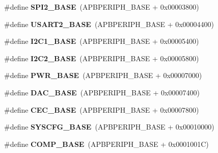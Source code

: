 \begin{DoxyCompactItemize}
\#define {\bfseries S\+P\+I2\+\_\+\+B\+A\+SE}~(A\+P\+B\+P\+E\+R\+I\+P\+H\+\_\+\+B\+A\+SE + 0x00003800)
\item 
\mbox{\label{group___peripheral__memory__map_gade83162a04bca0b15b39018a8e8ec090}} 
\#define {\bfseries U\+S\+A\+R\+T2\+\_\+\+B\+A\+SE}~(A\+P\+B\+P\+E\+R\+I\+P\+H\+\_\+\+B\+A\+SE + 0x00004400)
\item 
\mbox{\label{group___peripheral__memory__map_gacd72dbffb1738ca87c838545c4eb85a3}} 
\#define {\bfseries I2\+C1\+\_\+\+B\+A\+SE}~(A\+P\+B\+P\+E\+R\+I\+P\+H\+\_\+\+B\+A\+SE + 0x00005400)
\item 
\mbox{\label{group___peripheral__memory__map_ga04bda70f25c795fb79f163b633ad4a5d}} 
\#define {\bfseries I2\+C2\+\_\+\+B\+A\+SE}~(A\+P\+B\+P\+E\+R\+I\+P\+H\+\_\+\+B\+A\+SE + 0x00005800)
\item 
\mbox{\label{group___peripheral__memory__map_gac691ec23dace8b7a649a25acb110217a}} 
\#define {\bfseries P\+W\+R\+\_\+\+B\+A\+SE}~(A\+P\+B\+P\+E\+R\+I\+P\+H\+\_\+\+B\+A\+SE + 0x00007000)
\item 
\mbox{\label{group___peripheral__memory__map_gad18d0b914c7f68cecbee1a2d23a67d38}} 
\#define {\bfseries D\+A\+C\+\_\+\+B\+A\+SE}~(A\+P\+B\+P\+E\+R\+I\+P\+H\+\_\+\+B\+A\+SE + 0x00007400)
\item 
\mbox{\label{group___peripheral__memory__map_gaacb77bc44b3f8c87ab98f241e760e440}} 
\#define {\bfseries C\+E\+C\+\_\+\+B\+A\+SE}~(A\+P\+B\+P\+E\+R\+I\+P\+H\+\_\+\+B\+A\+SE + 0x00007800)
\item 
\mbox{\label{group___peripheral__memory__map_ga62246020bf3b34b6a4d8d0e84ec79d3d}} 
\#define {\bfseries S\+Y\+S\+C\+F\+G\+\_\+\+B\+A\+SE}~(A\+P\+B\+P\+E\+R\+I\+P\+H\+\_\+\+B\+A\+SE + 0x00010000)
\item 
\mbox{\label{group___peripheral__memory__map_gaa9f5d2999c6918e385d7a526c4f6b1d3}} 
\#define {\bfseries C\+O\+M\+P\+\_\+\+B\+A\+SE}~(A\+P\+B\+P\+E\+R\+I\+P\+H\+\_\+\+B\+A\+SE + 0x0001001\+C)

\end{DoxyCompactItemize}
